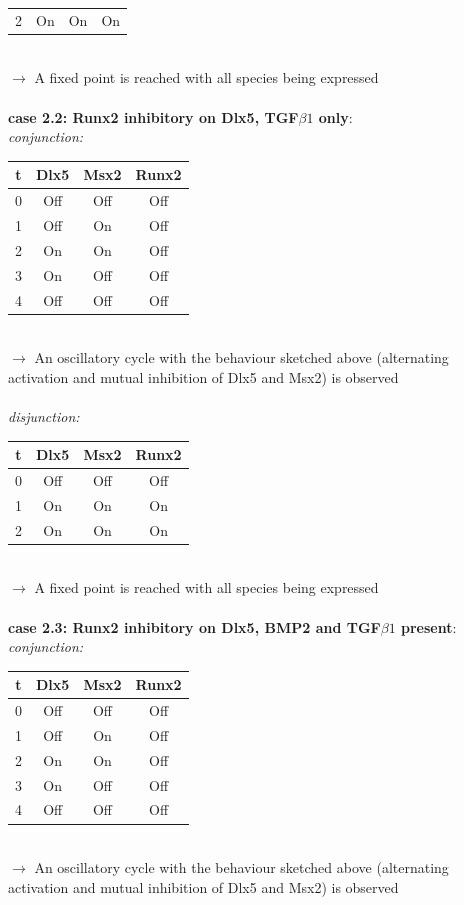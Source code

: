 \documentclass[11pt]{article}
\begin{document}
\begin{appendices}
\begin{tabular}{c c c c}
2 & On & On & On
\end{tabular}
\\
$\rightarrow$ A fixed point is reached with all species being expressed
\\ \\
\textbf{case 2.2: Runx2 inhibitory on Dlx5, TGF$\beta1$ only}: \\
\textit{conjunction:}
\\ 
\begin{tabular}{c c c c}
t & Dlx5 & Msx2 & Runx2 \\
\hline
0 & Off & Off & Off \\
1 & Off & On & Off \\
2 & On & On & Off \\
3 & On & Off & Off \\
4 & Off & Off & Off \\
\end{tabular}
\\
$\rightarrow$ An oscillatory cycle with the behaviour sketched above (alternating activation and mutual inhibition of Dlx5 and Msx2) is observed   
\\ \\
\textit{disjunction:}
\\ 
\begin{tabular}{c c c c}
t & Dlx5 & Msx2 & Runx2 \\
\hline
0 & Off & Off & Off \\
1 & On & On & On \\
2 & On & On & On \\
\end{tabular}
\\
$\rightarrow$ A fixed point is reached with all species being expressed
\\ \\
\textbf{case 2.3: Runx2 inhibitory on Dlx5, BMP2 and TGF$\beta1$ present}: \\
\textit{conjunction:}
\\ 
\begin{tabular}{c c c c}
t & Dlx5 & Msx2 & Runx2 \\
\hline
0 & Off & Off & Off \\
1 & Off & On & Off \\
2 & On & On & Off \\
3 & On & Off & Off \\
4 & Off & Off & Off
\end{tabular}
\\
$\rightarrow$ An oscillatory cycle with the behaviour sketched above (alternating activation and mutual inhibition of Dlx5 and Msx2) is observed    

\end{appendices}
\end{document}
